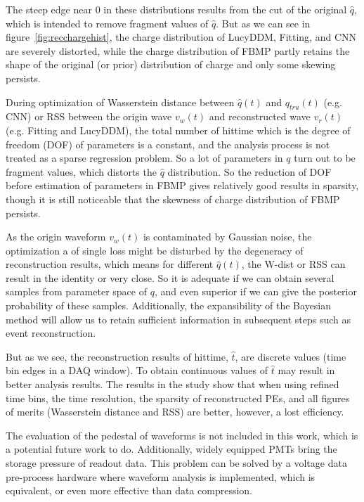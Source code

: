 The steep edge near 0 in these distributions results from the cut of the original $\hat{q}$, which is intended to remove fragment values of $\hat{q}$. But as we can see in figure~\ref{fig:recchargehist}, the charge distribution of LucyDDM, Fitting, and CNN are severely distorted, while the charge distribution of FBMP partly retains the shape of the original (or prior) distribution of charge and only some skewing persists. 

During optimization of Wasserstein distance between $\hat{q}(t)$ and $q_{tru}(t)$ (e.g. CNN) or RSS between the origin wave $v_{w}(t)$ and reconstructed wave $v_{r}(t)$ (e.g. Fitting and LucyDDM), the total number of hittime which is the degree of freedom (DOF) of parameters is a constant, and the analysis process is not treated as a sparse regression problem. So a lot of parameters in $q$ turn out to be fragment values, which distorts the $\hat{q}$ distribution. So the reduction of DOF before estimation of parameters in FBMP gives relatively good results in sparsity, though it is still noticeable that the skewness of charge distribution of FBMP persists. 


As the origin waveform $v_{w}(t)$ is contaminated by Gaussian noise, the optimization a of single loss might be disturbed by the degeneracy of reconstruction results, which means for different $\hat{q}(t)$, the W-dist or RSS can result in the identity or very close. So it is adequate if we can obtain several samples from parameter space of $q$, and even superior if we can give the posterior probability of these samples. Additionally, the expansibility of the Bayesian method will allow us to retain sufficient information in subsequent steps such as event reconstruction. 


But as we see, the reconstruction results of hittime, $\hat{t}$, are discrete values (time bin edges in a DAQ window). To obtain continuous values of $\hat{t}$ may result in better analysis results. The results in the study show that when using refined time bins, the time resolution, the sparsity of reconstructed PEs, and all figures of merits (Wasserstein distance and RSS) are better, however, a lost efficiency. 


The evaluation of the pedestal of waveforms is not included in this work, which is a potential future work to do. Additionally, widely equipped PMTs bring the storage pressure of readout data. This problem can be solved by a voltage data pre-process hardware where waveform analysis is implemented, which is equivalent, or even more effective than data compression. 

